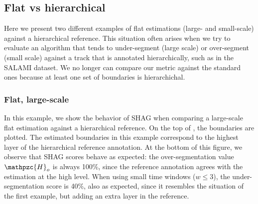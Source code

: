 \documentclass{article}
\def\shag{\ensuremath{\mathpzc{H}}}
\begin{document}
\subsection{Flat vs hierarchical}

Here we present two different examples of flat estimations (large- and small-scale) against a hierarchical reference.
This situation often arises when we try to evaluate an algorithm that tends to under-segment (large scale) or over-segment (small scale) against a track that is annotated
hierarchically, such as in the SALAMI dataset.
We no longer can compare our metric against the standard ones because at least one set of boundaries is hierarchichal.

\subsubsection{Flat, large-scale}

In this example, we show the behavior of SHAG when comparing a large-scale flat estimation against a hierarchical reference.
On the top of , the boundaries are plotted.
The estimated boundaries in this example correspond to the highest layer of the hierarchical reference annotation.
At the bottom of this figure, we observe that SHAG scores behave as expected: the over-segmentation value $\shag_o$ is always 100\%, since the reference annotation agrees with the
estimation at the high level.
When using small time windows ($w \leq 3$), the under-segmentation score is 40\%, also as expected, since it resembles the situation of the first example, but adding an extra layer in the reference.
\end{document}
